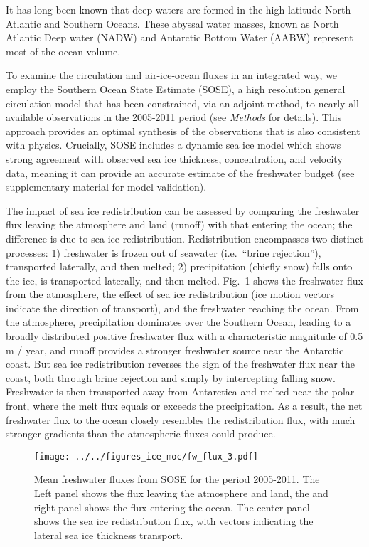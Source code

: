 \documentclass{naturemod}
\begin{document}
It has long been known that deep waters are formed in the high-latitude North Atlantic and Southern Oceans. These abyssal water masses, known as North Atlantic Deep water (NADW) and Antarctic Bottom Water (AABW) represent most of the ocean volume.

To examine the circulation and air-ice-ocean fluxes in an integrated way, we employ the Southern Ocean State Estimate (SOSE), a high resolution general circulation model that has been constrained, via an adjoint method, to nearly all available observations in the 2005-2011 period (see {\em Methods} for details). This approach provides an optimal synthesis of the observations that is also consistent with physics. Crucially, SOSE includes a dynamic sea ice model which shows strong agreement with observed sea ice thickness, concentration, and velocity data, meaning it can provide an accurate estimate of the freshwater budget (see supplementary material for model validation).

The impact of sea ice redistribution can be assessed by comparing the freshwater flux leaving the atmosphere and land (runoff) with that entering the ocean; the difference is due to sea ice redistribution. Redistribution encompasses two distinct processes: 1) freshwater is frozen out of seawater (i.e.~``brine rejection''), transported laterally, and then melted; 2) precipitation (chiefly snow) falls onto the ice, is transported laterally, and then melted. Fig.~1 shows the freshwater flux from the atmosphere, the effect of sea ice redistribution (ice motion vectors indicate the direction of transport), and the freshwater reaching the ocean. From the atmosphere, precipitation dominates over the Southern Ocean, leading to a broadly distributed positive freshwater flux with a characteristic magnitude of 0.5 m / year, and runoff provides a stronger freshwater source near the Antarctic coast. But sea ice redistribution reverses the sign of the freshwater flux near the coast, both through brine rejection and simply by intercepting falling snow. Freshwater is then transported away from Antarctica and melted near the polar front, where the melt flux equals or exceeds the precipitation. As a result, the net freshwater flux to the ocean closely resembles the redistribution flux, with much stronger gradients than the atmospheric fluxes could produce.

\begin{figure}
\begin{center}
\texttt{[image: ../../figures\_ice\_moc/fw\_flux\_3.pdf]}
\caption{Mean freshwater fluxes from SOSE for the period 2005-2011. The Left panel shows the flux leaving the atmosphere and land, the and right panel shows the flux entering the ocean. The center panel shows the sea ice redistribution flux, with vectors indicating the lateral sea ice thickness transport.}
\label{default}
\end{center}
\end{figure}
\end{document}
